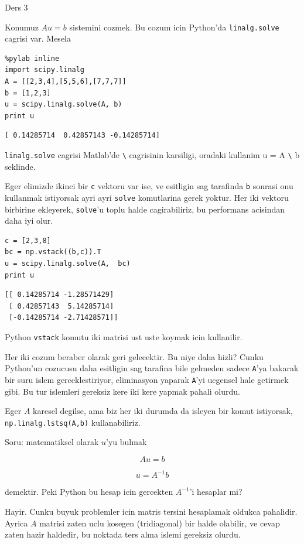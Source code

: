 \documentclass[12pt,fleqn]{article}\usepackage{../common}
\begin{document}
Ders 3

Konumuz $Au = b$ sistemini cozmek. Bu cozum icin Python'da
\verb!linalg.solve! cagrisi var. Mesela

\begin{verbatim}
%pylab inline
import scipy.linalg
A = [[2,3,4],[5,5,6],[7,7,7]]
b = [1,2,3]
u = scipy.linalg.solve(A, b)
print u
\end{verbatim}

\begin{verbatim}
[ 0.14285714  0.42857143 -0.14285714]
\end{verbatim}

\verb!linalg.solve! cagrisi Matlab'de \verb!\! cagrisinin karsiligi,
oradaki kullanim u = A \verb!\! b seklinde. 

Eger elimizde ikinci bir \verb!c! vektoru var ise, ve esitligin sag
tarafinda \verb!b! sonrasi onu kullanmak istiyorsak ayri ayri \verb!solve!
komutlarina gerek yoktur. Her iki vektoru birbirine ekleyerek,
\verb!solve!'u toplu halde cagirabiliriz, bu performans acisindan daha iyi
olur. 

\begin{verbatim}
c = [2,3,8]
bc = np.vstack((b,c)).T
u = scipy.linalg.solve(A,  bc)
print u
\end{verbatim}

\begin{verbatim}
[[ 0.14285714 -1.28571429]
 [ 0.42857143  5.14285714]
 [-0.14285714 -2.71428571]]
\end{verbatim}

Python \verb!vstack! komutu iki matrisi ust uste koymak icin kullanilir.

Her iki cozum beraber olarak geri gelecektir. Bu niye daha hizli? Cunku
Python'un cozucusu daha esitligin sag tarafina bile gelmeden sadece
\verb!A!'ya bakarak bir suru islem gerceklestiriyor, eliminasyon yaparak
\verb!A!'yi ucgensel hale getirmek gibi. Bu tur islemleri gereksiz kere iki
kere yapmak pahali olurdu.

Eger $A$ karesel degilse, ama biz her iki durumda da isleyen bir komut
istiyorsak, \verb!np.linalg.lstsq(A,b)! kullanabiliriz. 

Soru: matematiksel olarak $u$'yu bulmak 

\[ Au = b \]

\[ u = A^{-1}b \]

demektir. Peki Python bu hesap icin gercekten $A^{-1}$'i hesaplar mi?

Hayir. Cunku buyuk problemler icin matris tersini hesaplamak oldukca
pahalidir. Ayrica $A$ matrisi zaten uclu kosegen (tridiagonal) bir halde
olabilir, ve cevap zaten hazir haldedir, bu noktada ters alma islemi
gereksiz olurdu. 
\end{document}
